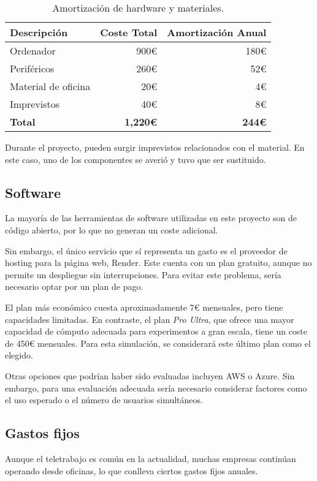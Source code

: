 \begin{table}[H]
\centering
\begin{tabular}{lrr}
\toprule
Descripción & Coste Total & Amortización Anual \\ 
\midrule
Ordenador & 900€ & 180€ \\
Periféricos & 260€ & 52€ \\
Material de oficina & 20€ & 4€ \\
Imprevistos & 40€ & 8€ \\
\textbf{Total} & \textbf{1,220€} & \textbf{244€} \\ 
\bottomrule
\end{tabular}
\caption{Amortización de hardware y materiales.}
\end{table}

Durante el proyecto, pueden surgir imprevistos relacionados con el material. En este caso, uno de los componentes se averió y tuvo que ser sustituido.

\subsection{Software}

La mayoría de las herramientas de software utilizadas en este proyecto son de código abierto, por lo que no generan un coste adicional.

Sin embargo, el único servicio que sí representa un gasto es el proveedor de hosting para la página web, Render. Este cuenta con un plan gratuito, aunque no permite un despliegue sin interrupciones. Para evitar este problema, sería necesario optar por un plan de pago. 

El plan más económico cuesta aproximadamente 7€ mensuales, pero tiene capacidades limitadas. En contraste, el plan \textit{Pro Ultra}, que ofrece una mayor capacidad de cómputo adecuada para experimentos a gran escala, tiene un coste de 450€ mensuales. Para esta simulación, se considerará este último plan como el elegido.

Otras opciones que podrían haber sido evaluadas incluyen AWS o Azure. Sin embargo, para una evaluación adecuada sería necesario considerar factores como el uso esperado o el número de usuarios simultáneos.

\subsection{Gastos fijos}

Aunque el teletrabajo es común en la actualidad, muchas empresas continúan operando desde oficinas, lo que conlleva ciertos gastos fijos anuales.

